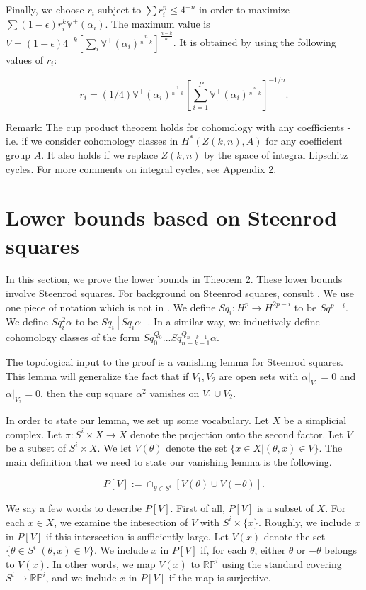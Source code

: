 \documentclass{amsart}
\newtheorem*{Theorem 1}{Theorem 1}
\newtheorem*{Theorem 2}{Theorem 2}
\newtheorem*{Theorem 1A}{Theorem 1A}
\newtheorem*{Theorem 2A}{Theorem 2A}
\newtheorem*{vanishing lemma}{Vanishing Lemma}
\numberwithin{equation}{section}
\begin{document}
Finally, we choose $r_i$ subject to $\sum r_i^n \le 4^{-n}$ in
order to maximize $\sum (1 - \epsilon) r_i^k \mathbb{V}^+(\alpha_i)$.  The
maximum value is $V = (1 - \epsilon) 4^{-k} [\sum_i
\mathbb{V}^+(\alpha_i)^{\frac{n}{n-k}}]^{\frac{n-k}{n}}$. It is obtained by
using the following values of $r_i$:

$$r_i = (1/4) \mathbb{V}^+(\alpha_i)^{\frac{1}{n-k}} [\sum_{i=1}^P
\mathbb{V}^+(\alpha_i)^{\frac{n}{n-k}}]^{-1/n}.$$

\endproof

Remark: The cup product theorem holds for cohomology with any
coefficients - i.e. if we consider cohomology classes in
$H^*(Z(k,n), A)$ for any coefficient group $A$.  It also holds if
we replace $Z(k,n)$ by the space of integral Lipschitz cycles. 
For more comments on integral cycles, see Appendix 2.




\section{Lower bounds based on Steenrod squares}

In this section, we prove the lower bounds in Theorem 2.  These lower
bounds involve Steenrod squares.  For background on
Steenrod squares, consult \cite{H}.  We use one piece of notation
which is not in \cite{H}.  We define $Sq_i: H^p \rightarrow H^{2p-i}$
to be $Sq^{p-i}$.  We define $Sq_i^2 \alpha$ to be $Sq_i [Sq_i \alpha]$.
In a similar way, we inductively define cohomology classes of the form
$Sq_0^{Q_0} ... Sq_{n-k-1}^{Q_{n-k-1}} \alpha$.

The topological input to the proof is a vanishing lemma
for Steenrod squares.  This lemma will generalize the fact that if $V_1, V_2$
are open sets with $\alpha|_{V_1} = 0$ and $\alpha|_{V_2} = 0$, then 
the cup square $\alpha^2$ vanishes on $V_1 \cup V_2$.

In order to state our lemma, we set up some vocabulary.  
Let $X$ be a simplicial complex.  
Let $\pi: S^i \times X \rightarrow X$ denote
the projection onto the second factor.  Let $V$ be a subset of
$S^i \times X$.  We let $V(\theta)$ denote the set $\{ x \in X |
(\theta, x) \in V \}$.  The main definition that we need to 
state our vanishing lemma is the following.

$$P[V] := \cap_{\theta \in S^i} [V(\theta) \cup V(- \theta)].$$

\noindent We say a few words to describe $P[V]$.  First of all,
$P[V]$ is a subset of $X$.  For each $x \in X$, we examine the
intesection of $V$ with $S^i \times \{ x \}$. 
Roughly, we include $x$ in $P[V]$ if this intersection is sufficiently
large.   Let $V(x)$ denote
the set $\{ \theta \in S^i | (\theta, x) \in V \}$.  
We include $x$ in $P[V]$ if, for each $\theta$,
either $\theta$ or $- \theta$ belongs to $V(x)$.  In other
words, we map $V(x)$ to $\mathbb{RP}^i$ using the 
standard covering $S^i \rightarrow \mathbb{RP}^i$, and we include $x$
in $P[V]$ if the map is surjective.
\end{document}
